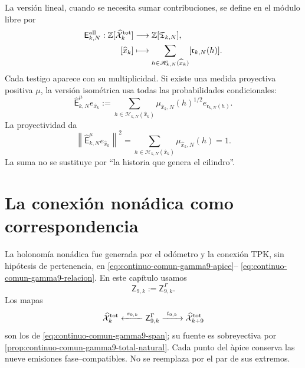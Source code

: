 La versi\'on lineal, cuando se necesita sumar contribuciones, se define en
el m\'odulo libre por
\begin{equation}
\label{eq:pdfv2-terminal-evaluacion-todas}
 \begin{aligned}
 \mathsf E_{k,N}^{\rm all}:
 \mathbb Z[\widehat{\mathcal X}^{\rm tot}_k]&\longrightarrow
 \mathbb Z[\mathfrak T_{k,N}],\\
 [\widehat x_k]&\longmapsto
 \sum_{h\in\mathscr H_{k,N}(\widehat x_k)}
 [\mathfrak r_{k,N}(h)].
 \end{aligned}
\end{equation}
Cada testigo aparece con su multiplicidad. Si existe una medida proyectiva
positiva \(\mu\), la versi\'on isom\'etrica usa todas las probabilidades
condicionales:
\begin{equation}
\label{eq:pdfv2-terminal-evaluacion-ponderada}
 \widehat{\mathsf E}_{k,N}^{\mu}e_{\widehat x_k}
 :=\sum_{h\in\mathscr H_{k,N}(\widehat x_k)}
 \mu_{\widehat x_k,N}(h)^{1/2}
 e_{\mathfrak r_{k,N}(h)}.
\end{equation}
La proyectividad da
\begin{equation}
\label{eq:pdfv2-terminal-isometria}
 \left\|\widehat{\mathsf E}_{k,N}^{\mu}e_{\widehat x_k}\right\|^2
 =\sum_{h\in\mathscr H_{k,N}(\widehat x_k)}
   \mu_{\widehat x_k,N}(h)=1.
\end{equation}
La suma no se sustituye por ``la historia que genera el cilindro''.

\section{La conexi\'on non\'adica como correspondencia}

La holonom\'ia non\'adica fue generada por el od\'ometro y la conexi\'on TPK,
sin hip\'otesis de pertenencia, en
\eqref{eq:continuo-comun-gamma9-apice}--
\eqref{eq:continuo-comun-gamma9-relacion}. En este cap\'itulo usamos
\begin{equation}
\label{eq:pdfv2-terminal-apice-gamma9}
 \mathsf Z_{9,k}:=\mathsf Z^{\Gamma}_{9,k}.
\end{equation}
Los mapas
\begin{equation}
\label{eq:pdfv2-terminal-span-gamma9}
 \widehat{\mathcal X}^{\rm tot}_k
 \xleftarrow{\ s_{9,k}\ }
 \mathsf Z^{\Gamma}_{9,k}
 \xrightarrow{\ t_{9,k}\ }
 \widehat{\mathcal X}^{\rm tot}_{k+9}
\end{equation}
son los de \eqref{eq:continuo-comun-gamma9-span}; su fuente es sobreyectiva
por \cref{prop:continuo-comun-gamma9-total-natural}. Cada punto del \`apice
conserva las nueve emisiones fase--compatibles. No se reemplaza por el par
de sus extremos.

